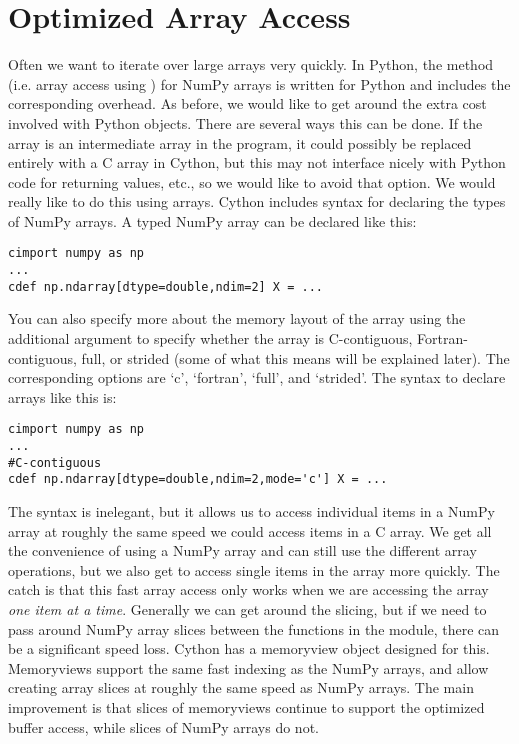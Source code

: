\section*{Optimized Array Access}

Often we want to iterate over large arrays very quickly.
In Python, the  method (i.e. array access using \li{[ ]}) for NumPy arrays is written for Python and includes the corresponding overhead.
As before, we would like to get around the extra cost involved with Python objects.
There are several ways this can be done.
If the array is an intermediate array in the program, it could possibly be replaced entirely with a C array in Cython, but this may not interface nicely with Python code for returning values, etc., so we would like to avoid that option.
We would really like to do this using arrays.
Cython includes syntax for declaring the types of NumPy arrays.
A typed NumPy array can be declared like this:
\begin{lstlisting}
cimport numpy as np
...
cdef np.ndarray[dtype=double,ndim=2] X = ...
\end{lstlisting}
You can also specify more about the memory layout of the array using the additional argument  to specify whether the array is C-contiguous, Fortran-contiguous, full, or strided (some of what this means will be explained later).
The corresponding options are `c', `fortran', `full', and `strided'.
The syntax to declare arrays like this is:
\begin{lstlisting}
cimport numpy as np
...
#C-contiguous
cdef np.ndarray[dtype=double,ndim=2,mode='c'] X = ...
\end{lstlisting}
The syntax is inelegant, but it allows us to access individual items in a NumPy array at roughly the same speed we could access items in a C array.
We get all the convenience of using a NumPy array and can still use the different array operations, but we also get to access single items in the array more quickly.
The catch is that this fast array access only works when we are accessing the array \textit{one item at a time}.
Generally we can get around the slicing, but if we need to pass around NumPy array slices between the functions in the module, there can be a significant speed loss.
Cython has a memoryview object designed for this.
Memoryviews support the same fast indexing as the NumPy arrays, and allow creating array slices at roughly the same speed as NumPy arrays.
The main improvement is that slices of memoryviews continue to support the optimized buffer access, while slices of NumPy arrays do not.
